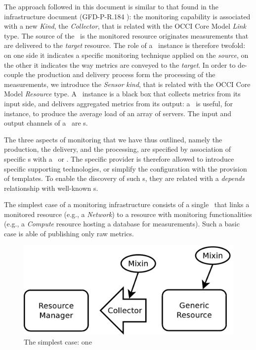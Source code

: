 \documentclass[12pt]{article}  %
\begin{document}
The approach followed in this document is similar to that found in the infrastructure document (GFD-P-R.184 \cite{occi:infr}): the monitoring capability is associated with a new {\em Kind}, the {\em Collector}, that is related with the OCCI Core Model {\em Link} type. The source of the \coll\ is the monitored resource originates measurements that are delivered to the {\em target} resource. The role of a \coll\ instance is therefore twofold: on one side it indicates a specific monitoring technique applied on the {\em source}, on the other it indicates the way metrics are conveyed to the {\em target}. In order to de-couple the production and delivery process form the processing of the measurements, we introduce the {\em Sensor} {\em kind}, that is related with the OCCI Core Model {\em Resource} type. A \sens\ instance is a black box that collects metrics from its input side, and delivers aggregated metrics from its output: a \sens\ is useful, for instance, to produce the average load of an array of servers. The input and output channels of a \sens\ are \coll s.

The three aspects of monitoring that we have thus outlined, namely the production, the delivery, and the processing, are specified by association of specific \mi s with a \sens\ or \coll. The specific provider is therefore allowed to introduce specific supporting technologies, or simplify the configuration with the provision of templates. To enable the discovery of such \mi s, they are related with a {\em depends} relationship with well-known \mi s.

The simplest case of a monitoring infrastructure consists of a single \coll\ that links a monitored resource (e.g., a {\em Network}) to a resource with monitoring functionalities (e.g., a {\em Compute} resource hosting a database for measurements). Such a basic case is able of publishing only raw metrics. 

\begin{figure}
\centering
\includegraphics[width=0.7 \linewidth]{self.pdf}
\caption{The simplest case: one \coll\  \label{fig:onestage}}
\end{figure}
\end{document}
